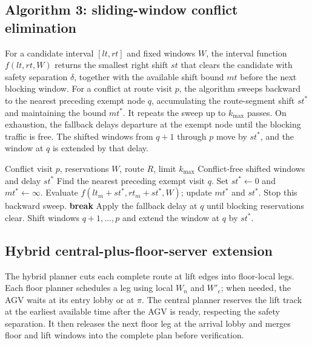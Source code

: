 \subsection{Algorithm 3: sliding-window conflict elimination}

For a candidate interval $[lt,rt]$ and fixed windows $W$, the interval
function $f(lt,rt,W)$ returns the smallest right shift $st$ that clears the
candidate with safety separation $\delta$, together with the available
shift bound $mt$ before the next blocking window. For a conflict at route
visit $p$, the algorithm sweeps backward to the nearest preceding exempt
node $q$, accumulating the route-segment shift $st^*$ and maintaining the
bound $mt^*$. It repeats the sweep up to $k_{\max}$ passes. On exhaustion,
the fallback delays departure at the exempt node until the blocking traffic
is free. The shifted windows from $q+1$ through $p$ move by $st^*$, and the
window at $q$ is extended by that delay.

\begin{algorithm}[t]
\caption{Sliding-window conflict elimination}
\label{alg:sliding}
\begin{algorithmic}[1]
\REQUIRE Conflict visit $p$, reservations $W$, route $R$, limit $k_{\max}$
\ENSURE Conflict-free shifted windows and delay $st^*$
\STATE Find the nearest preceding exempt visit $q$.
  \STATE Set $st^*\gets0$ and $mt^*\gets\infty$.
    \STATE Evaluate $f(lt_m+st^*,rt_m+st^*,W)$; update $mt^*$ and $st^*$.
     \STATE Stop this backward sweep. \ENDIF
  \ENDFOR
   \STATE \textbf{break} \ENDIF
\ENDFOR
{}
  \STATE Apply the fallback delay at $q$ until blocking reservations clear.
\ENDIF
\STATE Shift windows $q+1,\ldots,p$ and extend the window at $q$ by $st^*$.
\end{algorithmic}
\end{algorithm}

\subsection{Hybrid central-plus-floor-server extension}

The hybrid planner cuts each complete route at lift edges into floor-local
legs. Each floor planner schedules a leg using local $W_n$ and $W'_e$; when
needed, the AGV waits at its entry lobby or at $\pi$. The central planner
reserves the lift track at the earliest available time after the AGV is
ready, respecting the safety separation. It then releases the next floor leg
at the arrival lobby and merges floor and lift windows into the complete
plan before verification.

